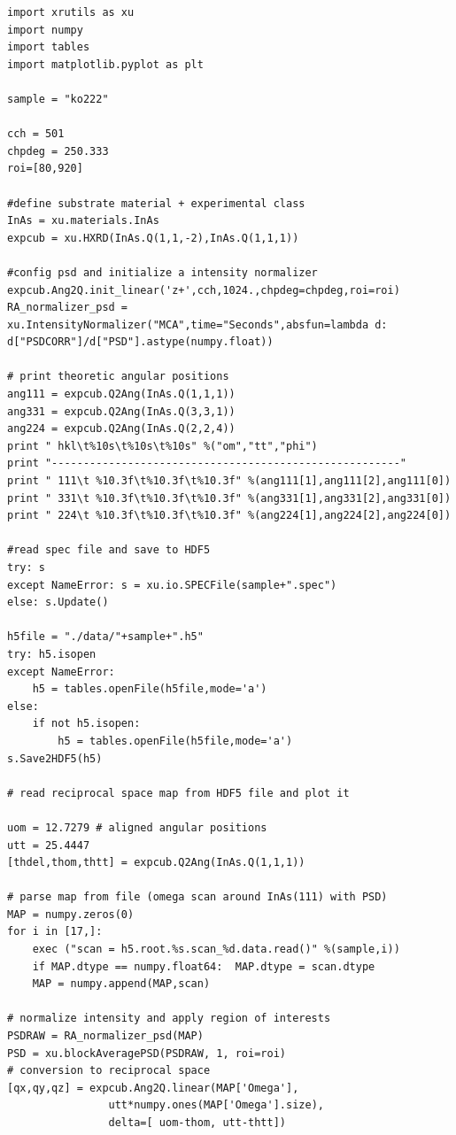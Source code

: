 \begin{lstlisting}[caption={reading a spec-file, saving it to HDF5, reading a particular scan, convert it to reciprocal space, plot it using matplotlib}]
import xrutils as xu
import numpy
import tables
import matplotlib.pyplot as plt

sample = "ko222"

cch = 501
chpdeg = 250.333
roi=[80,920]

#define substrate material + experimental class
InAs = xu.materials.InAs
expcub = xu.HXRD(InAs.Q(1,1,-2),InAs.Q(1,1,1))

#config psd and initialize a intensity normalizer
expcub.Ang2Q.init_linear('z+',cch,1024.,chpdeg=chpdeg,roi=roi)
RA_normalizer_psd = xu.IntensityNormalizer("MCA",time="Seconds",absfun=lambda d: d["PSDCORR"]/d["PSD"].astype(numpy.float))

# print theoretic angular positions
ang111 = expcub.Q2Ang(InAs.Q(1,1,1))
ang331 = expcub.Q2Ang(InAs.Q(3,3,1))
ang224 = expcub.Q2Ang(InAs.Q(2,2,4))
print " hkl\t%10s\t%10s\t%10s" %("om","tt","phi")
print "-------------------------------------------------------"
print " 111\t %10.3f\t%10.3f\t%10.3f" %(ang111[1],ang111[2],ang111[0])
print " 331\t %10.3f\t%10.3f\t%10.3f" %(ang331[1],ang331[2],ang331[0])
print " 224\t %10.3f\t%10.3f\t%10.3f" %(ang224[1],ang224[2],ang224[0])

#read spec file and save to HDF5
try: s
except NameError: s = xu.io.SPECFile(sample+".spec")
else: s.Update()

h5file = "./data/"+sample+".h5"
try: h5.isopen
except NameError:
    h5 = tables.openFile(h5file,mode='a')
else: 
    if not h5.isopen:
        h5 = tables.openFile(h5file,mode='a')
s.Save2HDF5(h5)

# read reciprocal space map from HDF5 file and plot it

uom = 12.7279 # aligned angular positions
utt = 25.4447
[thdel,thom,thtt] = expcub.Q2Ang(InAs.Q(1,1,1))

# parse map from file (omega scan around InAs(111) with PSD)
MAP = numpy.zeros(0)
for i in [17,]:
    exec ("scan = h5.root.%s.scan_%d.data.read()" %(sample,i))
    if MAP.dtype == numpy.float64:  MAP.dtype = scan.dtype
    MAP = numpy.append(MAP,scan)
                
# normalize intensity and apply region of interests
PSDRAW = RA_normalizer_psd(MAP)
PSD = xu.blockAveragePSD(PSDRAW, 1, roi=roi)
# conversion to reciprocal space
[qx,qy,qz] = expcub.Ang2Q.linear(MAP['Omega'],
                utt*numpy.ones(MAP['Omega'].size),
                delta=[ uom-thom, utt-thtt])


\end{lstlisting}
